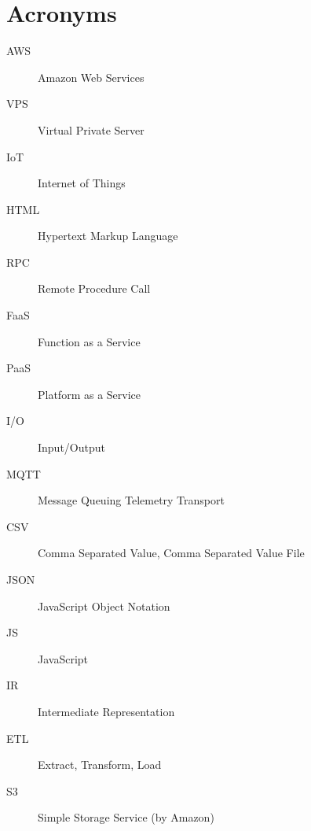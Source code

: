 \documentclass[../main.tex]{subfiles}
\begin{document}
\chapter{Acronyms}

\begin{description}
  \item[AWS] Amazon Web Services
  \item[VPS] Virtual Private Server
  \item[IoT] Internet of Things
  \item[HTML] Hypertext Markup Language
  \item[RPC] Remote Procedure Call
  \item[FaaS] Function as a Service
  \item[PaaS] Platform as a Service
  \item[I/O] Input/Output
  \item[MQTT] Message Queuing Telemetry Transport
  \item[CSV] Comma Separated Value, Comma Separated Value File 
  \item[JSON] JavaScript Object Notation
  \item[JS] JavaScript
  \item[IR] Intermediate Representation
  \item[ETL] Extract, Transform, Load
  \item[S3] Simple Storage Service (by Amazon)
\end{description}

\end{document}
